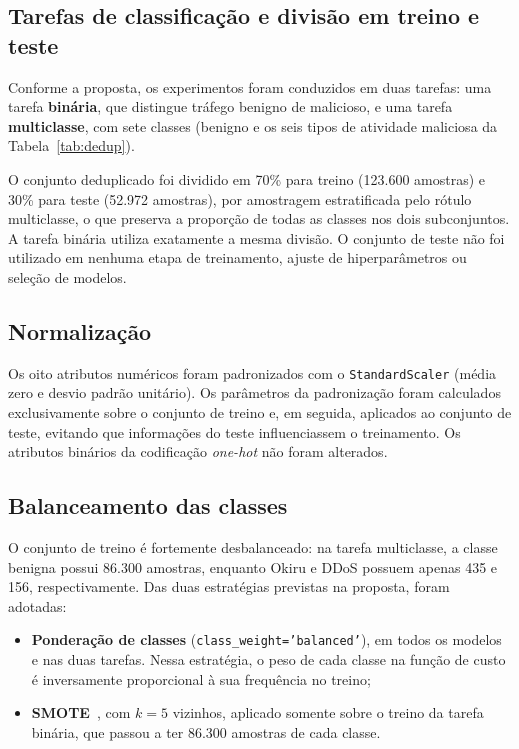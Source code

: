 \subsection{Tarefas de classificação e divisão em treino e teste}

Conforme a proposta, os experimentos foram conduzidos em duas tarefas: uma tarefa \textbf{binária}, que distingue tráfego benigno de malicioso, e uma tarefa \textbf{multiclasse}, com sete classes (benigno e os seis tipos de atividade maliciosa da Tabela~\ref{tab:dedup}).

O conjunto deduplicado foi dividido em 70\% para treino (123.600 amostras) e 30\% para teste (52.972 amostras), por amostragem estratificada pelo rótulo multiclasse, o que preserva a proporção de todas as classes nos dois subconjuntos. A tarefa binária utiliza exatamente a mesma divisão. O conjunto de teste não foi utilizado em nenhuma etapa de treinamento, ajuste de hiperparâmetros ou seleção de modelos.

\subsection{Normalização}

Os oito atributos numéricos foram padronizados com o \texttt{StandardScaler} (média zero e desvio padrão unitário). Os parâmetros da padronização foram calculados exclusivamente sobre o conjunto de treino e, em seguida, aplicados ao conjunto de teste, evitando que informações do teste influenciassem o treinamento. Os atributos binários da codificação \textit{one-hot} não foram alterados.

\subsection{Balanceamento das classes}

O conjunto de treino é fortemente desbalanceado: na tarefa multiclasse, a classe benigna possui 86.300 amostras, enquanto Okiru e DDoS possuem apenas 435 e 156, respectivamente. Das duas estratégias previstas na proposta, foram adotadas:
\begin{itemize}
    \item \textbf{Ponderação de classes} (\texttt{class\_weight='balanced'}), em todos os modelos e nas duas tarefas. Nessa estratégia, o peso de cada classe na função de custo é inversamente proporcional à sua frequência no treino;
    \item \textbf{SMOTE}~\cite{chawla2002smote}, com $k=5$ vizinhos, aplicado somente sobre o treino da tarefa binária, que passou a ter 86.300 amostras de cada classe.
\end{itemize}

